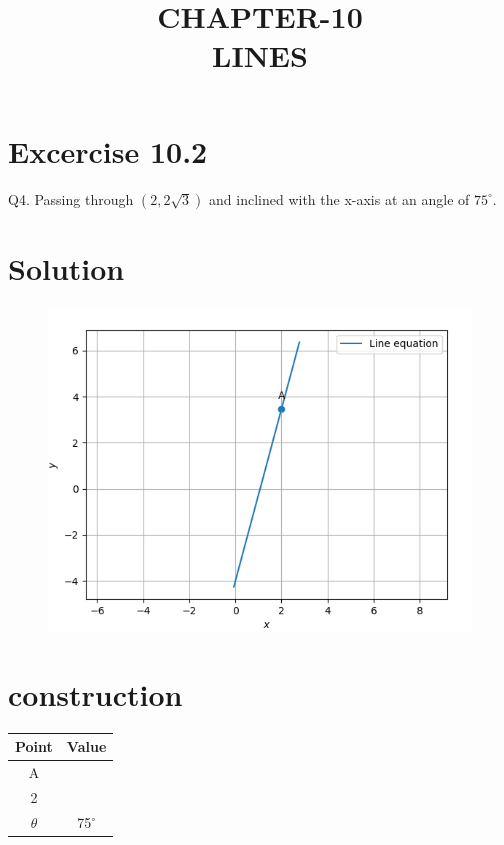 \documentclass[journal,10pt,twocolumn]{article}
\title{\textbf{CHAPTER-10 \\ LINES}}
\newcommand{\myvec}[1]{\ensuremath{\begin{pmatrix}#1\end{pmatrix}}}
\begin{document}
\maketitle
\section*{Excercise 10.2}

Q4. Passing through $(2,2\sqrt{3})$ and inclined with the x-axis at an angle of $75^\circ$.

\section*{\large Solution}

\begin{figure}[H]
\centering
\includegraphics[width=1\columnwidth]{./figs/line.png}	
\caption{}
\end{figure}


\section{construction}

\begin{tabular}{|c|c|}
	\hline
	\textbf{Point}&\textbf{Value}\\
	\hline
	A&\myvec{2\\2\sqrt{3}}\\
	\hline
	$\theta$&75$^\circ$\\
	\hline
	
	
\end{tabular}
\end{document}
